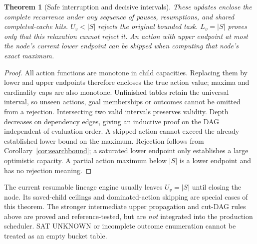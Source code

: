 \documentclass[11pt]{article}
\newtheorem{theorem}{Theorem}[section]
\theoremstyle{definition}
\newcommand{\card}[1]{\lvert #1\rvert}
\begin{document}
\begin{theorem}[Safe interruption and decisive intervals]\label{thm:interval}
These updates enclose the complete recurrence under any sequence of pauses,
resumptions, and shared completed-cache hits. $U_v<\card S$ rejects the original
bounded task. $L_v=\card S$ proves only that this relaxation cannot reject it.
An action with upper endpoint at most the node's current lower endpoint can
be skipped when computing that node's exact maximum.
\end{theorem}
\begin{proof}
All action functions are monotone in child capacities. Replacing them by lower
and upper endpoints therefore encloses the true action value; maxima and
cardinality caps are also monotone. Unfinished tables retain the universal
interval, so unseen actions, goal memberships or outcomes cannot be omitted
from a rejection. Intersecting two valid intervals preserves validity.
Depth decreases on dependency edges, giving an inductive proof on the DAG
independent of evaluation order. A skipped action cannot exceed the already
established lower bound on the maximum. Rejection follows from
Corollary~\ref{cor:searchbound}; a saturated lower endpoint only establishes a
large optimistic capacity. A partial action maximum below $\card S$ is a lower
endpoint and has no rejection meaning.
\end{proof}
The current resumable lineage engine usually leaves $U_v=\card S$ until closing
the node. Its saved-child ceilings and dominated-action skipping are special
cases of this theorem. The stronger intermediate upper propagation and cut-DAG
rules above are proved and reference-tested, but are \emph{not} integrated into
the production scheduler. SAT UNKNOWN or incomplete outcome enumeration cannot
be treated as an empty bucket table.
\end{document}
